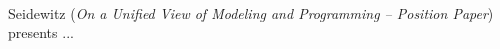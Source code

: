 

\ \hline \ %

Seidewitz
\cite{isola-2016-seidewitz}
({\em On a Unified View of Modeling and Programming -- Position Paper})
presents ...

